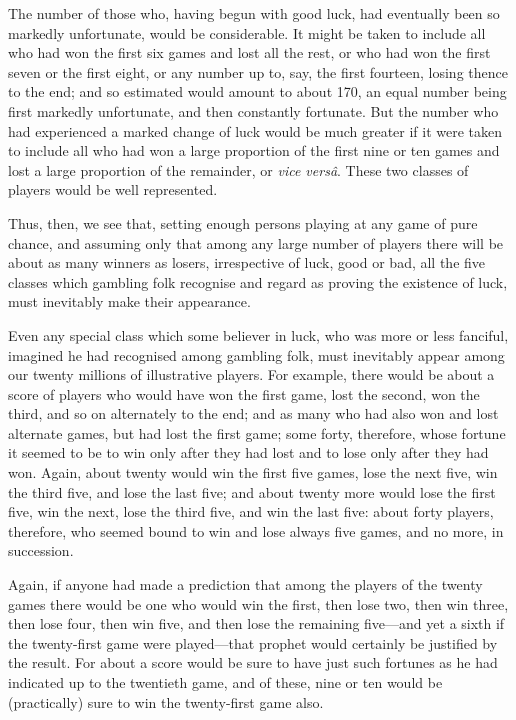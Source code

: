 \documentclass[letterpaper,12pt,oneside,openany]{memoir}
\begin{document}
The number of those who, having begun with good
luck, had eventually been so markedly unfortunate,
would be considerable. It might be taken to include
all who had won the first six games and lost all the rest,
or who had won the first seven or the first eight, or any
number up to, say, the first fourteen, losing thence to
the end; and so estimated would amount to about 170,
an equal number being first markedly unfortunate, and
then constantly fortunate. But the number who had
experienced a marked change of luck would be much
greater if it were taken to include all who had
won a large proportion of the first nine or ten games
and lost a large proportion of the remainder, or 
\textit{vice vers\^a}. These two classes of players would 
be well represented.

Thus, then, we see that, setting enough persons
playing at any game of pure chance, and assuming
only that among any large number of players there
will be about as many winners as losers, irrespective of
luck, good or bad, all the five classes which gambling
folk recognise and regard as proving the existence of
luck, must inevitably make their appearance.

Even any special class which some believer in luck,
who was more or less fanciful, imagined he had recognised
among gambling folk, must inevitably appear
among our twenty millions of illustrative players. For
example, there would be about a score of players who
would have won the first game, lost the second, won
the third, and so on alternately to the end; and as
many who had also won and lost alternate games, but
had lost the first game; some forty, therefore, whose
fortune it seemed to be to win only after they had lost
and to lose only after they had won. Again, about
twenty would win the first five games, lose the next
five, win the third five, and lose the last five; and
about twenty more would lose the first five, win the
next, lose the third five, and win the last five: about
forty players, therefore, who seemed bound to win and
lose always five games, and no more, in succession.

Again, if anyone had made a prediction that among
the players of the twenty games there would be one
who would win the first, then lose two, then win three,
then lose four, then win five, and then lose the remaining
five---and yet a sixth if the twenty-first game were
played---that prophet would certainly be justified by
the result. For about a score would be sure to have
just such fortunes as he had indicated up to the
twentieth game, and of these, nine or ten would be
(practically) sure to win the twenty-first game also.
\end{document}
